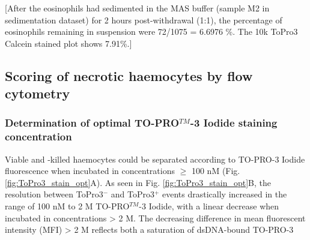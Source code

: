 [After the eosinophils had sedimented in the MAS buffer (sample M2 in sedimentation dataset) for 2 hours post-withdrawal (1:1), the percentage of eosinophils remaining in suspension were 72/1075 = 6.6976 \%. The 10k ToPro3 Calcein stained plot shows 7.91\%.]
\newpage



\subsection{Scoring of necrotic haemocytes by flow cytometry}
\subsubsection{Determination of optimal TO-PRO$^{TM}$-3 Iodide staining concentration}
Viable and -killed haemocytes could be separated according to TO-PRO-3 Iodide fluorescence when incubated in concentrations $\geq$ 100 nM (Fig. \ref{fig:ToPro3_stain_opt}A). As seen in Fig. \ref{fig:ToPro3_stain_opt}B, the resolution between ToPro3$^{-}$ and ToPro3$^{+}$ events drastically increased in the range of 100 nM to 2 \micro M TO-PRO$^{TM}$-3 Iodide, with a linear decrease when incubated in concentrations > 2 \micro M. The decreasing difference in mean fluorescent intensity (MFI) > 2 \micro M reflects both a saturation of dsDNA-bound TO-PRO-3



